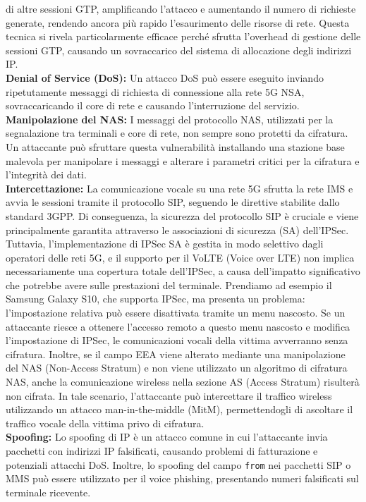 \documentclass[english]{article}
\begin{document}
  di altre sessioni GTP, amplificando l'attacco e aumentando il numero di richieste generate, 
  rendendo ancora più rapido l'esaurimento delle risorse di rete. Questa tecnica si rivela 
  particolarmente efficace perché sfrutta l'overhead di gestione delle sessioni GTP, 
  causando un sovraccarico del sistema di allocazione degli indirizzi IP.\@
\\[0.2cm]
\textbf{Denial of Service (DoS):} Un attacco DoS può essere eseguito inviando ripetutamente
messaggi di richiesta di connessione alla rete 5G NSA, sovraccaricando il core di rete e
causando l'interruzione del servizio.
\\[0.2cm]
\textbf{Manipolazione del NAS:} I messaggi del protocollo NAS, utilizzati per la segnalazione
tra terminali e core di rete, non sempre sono protetti da cifratura. Un attaccante può
sfruttare questa vulnerabilità installando una stazione base malevola per manipolare i
messaggi e alterare i parametri critici per la cifratura e l'integrità dei dati.
\\[0.2cm]
\textbf{Intercettazione:} La comunicazione vocale su una rete 5G sfrutta la rete IMS e
avvia le sessioni tramite il protocollo SIP, seguendo le direttive stabilite dallo standard 3GPP.
Di conseguenza, la sicurezza del protocollo SIP è cruciale e viene principalmente garantita attraverso
le associazioni di sicurezza (SA) dell'IPSec. Tuttavia, l'implementazione di IPSec SA è
gestita in modo selettivo dagli operatori delle reti 5G, e il supporto per il VoLTE (Voice over LTE)
non implica necessariamente una copertura totale dell'IPSec,
a causa dell'impatto significativo che potrebbe avere sulle prestazioni del terminale.
Prendiamo ad esempio il Samsung Galaxy S10,
che supporta IPSec, ma presenta un problema: l'impostazione relativa può essere disattivata tramite
un menu nascosto. Se un attaccante riesce a ottenere l'accesso remoto a questo menu nascosto e
modifica l'impostazione di IPSec, le comunicazioni vocali della vittima avverranno senza cifratura.
Inoltre, se il campo EEA viene alterato mediante una manipolazione del NAS (Non-Access Stratum)
e non viene utilizzato un algoritmo di cifratura NAS, anche la comunicazione wireless nella
sezione AS (Access Stratum) risulterà non cifrata. In tale scenario, l'attaccante può intercettare
il traffico wireless utilizzando un attacco man-in-the-middle (MitM), permettendogli di ascoltare
il traffico vocale della vittima privo di cifratura.
\\[0.2cm]
\textbf{Spoofing:} Lo spoofing di IP è un attacco comune in cui l'attaccante invia pacchetti
con indirizzi IP falsificati, causando problemi di fatturazione e potenziali attacchi DoS.
Inoltre, lo spoofing del campo \texttt{from} nei pacchetti SIP o MMS può essere utilizzato
per il voice phishing, presentando numeri falsificati sul terminale ricevente.
\end{document}
